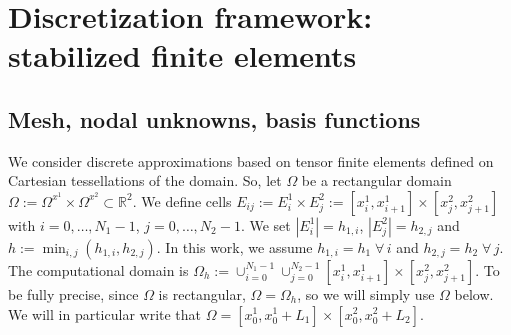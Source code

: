 \documentclass[a4paper,10pt]{article}
\begin{document}
%

\section{Discretization framework: stabilized finite elements}\label{sec:discretization}

\subsection{Mesh, nodal unknowns, basis functions}

We consider discrete approximations based on tensor finite elements defined on 
Cartesian tessellations of the domain.  So, let $\Omega$ be  a rectangular  domain $\Omega := \Omega^{x^1} \times \Omega^{x^2} \subset \mathbb R^2$. We define 
   cells $E_{ij}:=   E^{1}_i \times E^{2}_j := [x^1_{i},x^1_{i+1}]\times [x^2_{j}, x^2_{j+1}]$ with $i=0,\dots, N_1-1$, $j=0,\dots,N_2-1$.
We  set   $|E^{1}_i|=h_{1,i}$, $|E_j^{2}|=h_{2,j}$  and $h:=\min_{i,j}( h_{1,i},h_{2,j})$. 
In this work, we assume   $h_{1,i}=h_1\;\forall\,i$  and $h_{2,j}= h_2\;\forall\,j$.  The computational domain is  $\Omega_{h}:=\cup_{i=0}^{N_1-1}\cup_{j=0}^{{N_2}-1} [x^1_{i},x^1_{i+1}]\times [x^2_{j},x^2_{j+1}]$.
To be fully precise,  since $\Omega$ is rectangular, $\Omega = \Omega_h$, so we will simply use $\Omega$ below. We will in particular write that  $\Omega =[x^1_0, x^1_0+L_1]\times  [x^2_0, x^2_0+L_2]$.\\
\end{document}
